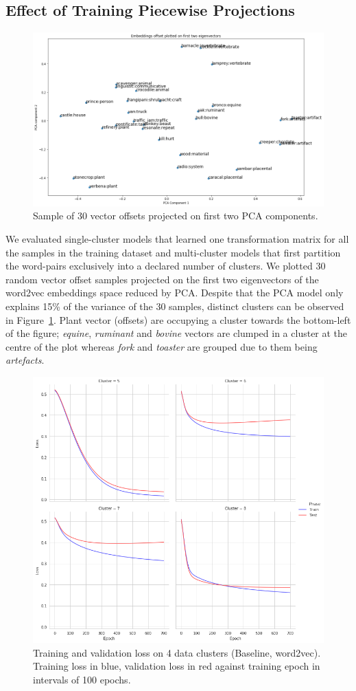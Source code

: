 \subsection{Effect of Training Piecewise Projections}
\begin{figure}[ht!] 
  \centering
  \includegraphics[width=0.75\linewidth]{images/Sample_of_30_vector_offsets_PCA.png}
  \caption{Sample of 30 vector offsets projected on first two PCA components.}
  \label{fig:cluster_30_samp_pca}
\end{figure}
We evaluated single-cluster models that learned one transformation matrix for all the samples in the training dataset and multi-cluster models that first partition the word-pairs exclusively into a declared number of clusters.  We plotted 30 random vector offset samples projected on the first two eigenvectors of the word2vec embeddings space reduced by \ac{PCA}.  Despite that the PCA model only explains 15\% of the variance of the 30 samples, distinct clusters can be observed in Figure~\ref{fig:cluster_30_samp_pca}.  Plant vector (offsets) are occupying a cluster towards the bottom-left of the figure; \textit{equine}, \textit{ruminant} and \textit{bovine} vectors are clumped in a cluster at the centre of the plot whereas \textit{fork} and \textit{toaster} are grouped due to them being \textit{artefacts}.

\begin{figure}[ht!] 
  \centering
  \includegraphics[width=0.75\linewidth]{images/Train_losses_4_clusters_baseline_w2v.png}
  \caption[Training and validation loss on 4 data clusters (Baseline, word2vec)]{Training and validation loss on 4 data clusters (Baseline, word2vec).  Training loss in blue, validation loss in red against training epoch in intervals of 100 epochs.}
  \label{fig:train_test_loss_w2v}
\end{figure}

